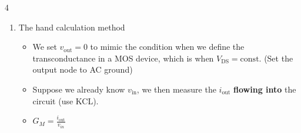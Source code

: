 \documentclass[10pt, landscape]{article}
\begin{document}
\begin{multicols}{4}
\begin{enumerate}
\begin{enumerate}
\begin{itemize}
        \end{itemize}
        \item The hand calculation method
        \begin{itemize}
            \item We set $v_{\text{out}}=0$ to mimic the condition when we define the transconductance in a MOS device, which is when $V_{\text{DS}}=\text{const}$. (Set the output node to AC ground)
            \item Suppose we already know $v_{\text{in}}$, we then measure the $i_{\text{out}}$ \textbf{flowing into} the circuit (use KCL).
            \item $G_M=\frac{i_\text{out}}{v_{in}}$
        \end{itemize}
    \end{enumerate}
\end{enumerate}


\end{multicols}
\end{document}
